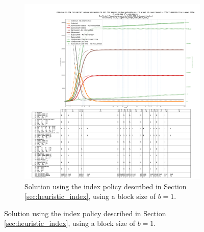 \documentclass{article}
\begin{document}
\begin{figure}[H]\ContinuedFloat
    \begin{subfigure}{\textwidth}
        \begin{center}
            \includegraphics[width=1.2\linewidth]{figures/heuristic_solutions/system_state_vs_time_T100_baron__solve_and_process_simple_index_block_size_1.pdf}
        \end{center}
        \caption{Solution using the index policy described in Section \ref{sec:heuristic_index}, using a block size of $b=1$.}\label{fig:heuristic_index_blocksize1}
    \end{subfigure}
\end{figure}
\end{document}
